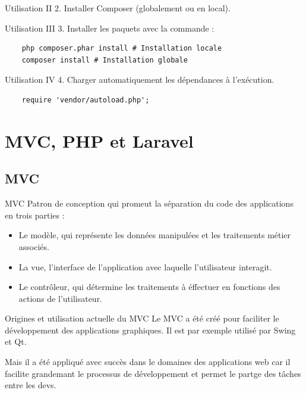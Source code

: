 \documentclass{beamer}
\begin{document}
\begin{frame}{Utilisation II}
  2. Installer Composer (globalement ou en local).
\end{frame}

\begin{frame}[fragile]{Utilisation III}
  3. Installer les paquets avec la commande :
  \begin{Verbatim}
    php composer.phar install # Installation locale
    composer install # Installation globale
  \end{Verbatim}
\end{frame}

\begin{frame}[fragile]{Utilisation IV}
  4. Charger automatiquement les dépendances à l'exécution.
  \begin{verbatim}
    require 'vendor/autoload.php';
  \end{verbatim}
\end{frame}

\section{MVC, PHP et Laravel}

\subsection{MVC}
\begin{frame}{MVC}
Patron de conception qui promeut la séparation du code des applications en trois parties :
\begin{itemize}
  \item Le modèle, qui représente les données manipulées et les traitements métier associés.
  \item La vue, l'interface de l'application avec laquelle l'utilisateur interagit.
  \item Le contrôleur, qui détermine les traitements à éffectuer en fonctions des actions de l'utilisateur.
\end{itemize}
\end{frame}

\begin{frame}{Origines et utilisation actuelle du MVC}
Le MVC a été créé pour faciliter le développement des applications graphiques. Il est par exemple utilisé par Swing et Qt.

Mais il a été appliqué avec succès dans le domaines des applications web car il facilite grandemant le processus de développement et permet le partge des tâches entre les devs.
\end{frame}
\end{document}
